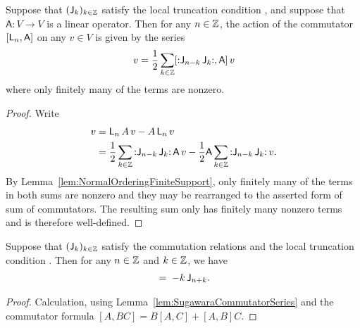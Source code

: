 \begin{lemma}
  \label{lem:SugawaraCommutatorSeries}
  \leanok
  Suppose that $(\mathsf{J}_{k})_{k \in \mathbb{Z}}$ satisfy the local truncation condition
  \tagHeiTrunc{}, and suppose that $\mathsf{A} \colon V \to V$ is a linear operator.
  Then for any $n \in \mathbb{Z}$, the action of the commutator $[\mathsf{L}_n, \mathsf{A}]$
  on any $v \in V$ is given by the series
  \begin{align*}
    [\Loper_n, \mathsf{A}] \, v =
    \frac{1}{2} \sum_{k \in \bZ} [\normalOrder{\Joper_{n-k} \, \Joper_k}, \mathsf{A}] \, v
  \end{align*}
  where only finitely many of the terms are nonzero.
\end{lemma}
\begin{proof}
  \leanok
  Write
  \begin{align*}
    [\Loper_n, A] \, v
    = \; & \Loper_n \, A \, v - A \, \Loper_n \, v \\
    = \; & \frac{1}{2} \sum_{k \in \bZ} \normalOrder{\Joper_{n-k} \, \Joper_k} \, \mathsf{A} \, v
        - \frac{1}{2} \mathsf{A} \sum_{k \in \bZ} \normalOrder{\Joper_{n-k} \, \Joper_k} \, v .
  \end{align*}
  By Lemma~\ref{lem:NormalOrderingFiniteSupport}, only finitely many of the terms
  in both sums are nonzero and they may be rearranged to the asserted form of sum of
  commutators. The resulting sum only has finitely many nonzero terms and is therefore
  well-defined.
\end{proof}

\begin{lemma}
  \label{lem:CommutatorSugawaraHeisenberg}
  \leanok
  Suppose that $(\mathsf{J}_{k})_{k \in \mathbb{Z}}$ satisfy the commutation relations
  \tagHeiComm{} and the local truncation condition
  \tagHeiTrunc{}. Then for any $n \in \mathbb{Z}$ and $k \in \mathbb{Z}$, we have
  \begin{align*}
    [\Loper_n, \Joper_k] \; = \;
    - k \, \Joper_{n+k} .
  \end{align*}
\end{lemma}
\begin{proof}
  \leanok
  Calculation, using Lemma~\ref{lem:SugawaraCommutatorSeries} and
  the commutator formula $[A,BC] = B[A,C] + [A,B]C$.
\end{proof}

